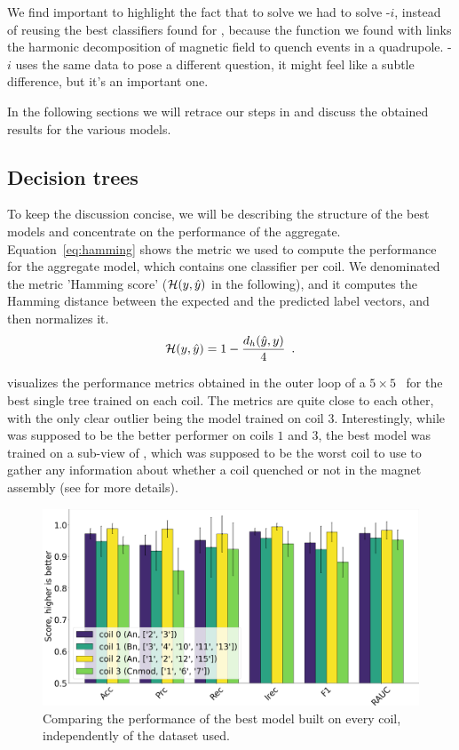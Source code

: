 \smallskip

We find important to highlight the fact that to solve \qlp we had to solve \qrp-$i$, instead of
reusing the best classifiers found for \qrp, because the function we found with \qrp links the
harmonic decomposition of magnetic field to quench events in a quadrupole. \qrp-$i$ uses the same
data to pose a different question, it might feel like a subtle difference, but it's an important
one.

In the following sections we will retrace our steps in  and discuss the obtained results for the various models.

\subsection{Decision trees}
To keep the discussion concise, we will be describing the structure of the best models and
concentrate on the performance of the aggregate. Equation~\ref{eq:hamming} shows the metric we used to
compute the performance for the aggregate model, which contains one classifier per coil. We
denominated the metric 'Hamming score' ($\mathcal{H}(y, \hat{y})$ in the following), and it computes the Hamming
distance between the expected and the predicted label vectors, and then normalizes it.
\begin{equation}
	\label{eq:hamming}
	\mathcal{H}(y, \hat{y}) = 1 - \frac{d_h(\hat{y}, y)}{4} \enspace.
\end{equation}

 visualizes the performance metrics obtained in the outer loop of a $5\times5$ \ncv\ for the best single tree trained on each coil. The metrics are quite close to each other,
with the only clear outlier being the model trained on coil $3$. Interestingly, while \bn was
supposed to be the better performer on coils $1$ and $3$, the best model was trained on a sub-view
of \cnmod, which was supposed to be the worst coil to use to gather any information about whether a
coil quenched or not in the magnet assembly (see  for more details).
\begin{figure}[!ht]
	\centering
	\includegraphics[width=0.7\linewidth]{img/best_dts_qlp.png}
	\caption{Comparing the performance of the best model built on every coil, independently of
		the dataset used.} \label{fig:bdts-qlp}
\end{figure}

